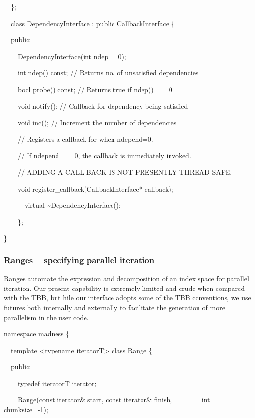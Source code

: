 \documentclass[letterpaper]{article}
\begin{document}
{\ttfamily
\ \ \};}


\bigskip

{\ttfamily
\ \ class DependencyInterface : public CallbackInterface \{}

{\ttfamily
\ \ public:}

{\ttfamily
\ \ \ \ DependencyInterface(int ndep = 0);}

{\ttfamily
\ \ \ \ int ndep() const; // Returns no. of unsatisfied dependencies}

{\ttfamily
\ \ \ \ bool probe() const; // Returns true if ndep() == 0}

{\ttfamily
\ \ \ \ void notify(); // Callback for dependency being satisfied}

{\ttfamily
\ \ \ \ void inc(); // Increment the number of dependencies}


\bigskip

{\ttfamily
\ \ \ \ // Registers a callback for when ndepend=0.}

{\ttfamily
\ \ \ \ // If ndepend == 0, the callback is immediately invoked.}

{\ttfamily
\ \ \ \ // ADDING A CALL BACK IS NOT PRESENTLY THREAD SAFE.}

{\ttfamily
\ \ \ \ void register\_callback(CallbackInterface* callback);}


\bigskip

{\ttfamily
\ \ \ \ \ \ virtual \~{}DependencyInterface();}

{\ttfamily
\ \ \ \ \};}

\}

\subsubsection{Ranges -- specifying parallel iteration}
Ranges automate the expression and decomposition of an index space for parallel iteration. Our present capability is
extremely limited and crude when compared with the TBB, but hile our interface adopts some of the TBB conventions, we
use futures both internally and externally to facilitate the generation of more parallelism in the user code.

{\ttfamily
namespace madness \{}

{\ttfamily
\ \ template {\textless}typename iteratorT{\textgreater} class Range \{}

{\ttfamily
\ \ public:}

{\ttfamily
\ \ \ \ typedef iteratorT iterator;}

{\ttfamily
\ \ \ \ Range(const iterator\& start, const iterator\& finish, \newline
\ \ \ \ \ \ \ \ int chunksize=-1);}
\end{document}
